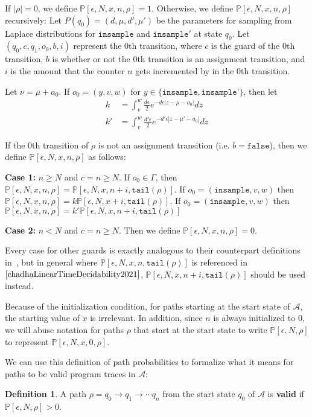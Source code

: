 \documentclass[12pt]{article}
\newcommand{\PP}{\mathbb{P}}
\theoremstyle{definition}
\newtheorem{defn}[thm]{Definition}
\begin{document}
If $|\rho| = 0$, we define $\PP[\epsilon, N, x, n, \rho] = 1$.
Otherwise, we define $\PP[\epsilon, N, x, n, \rho]$ recursively:
Let $P(q_0) = (d, \mu, d', \mu')$ be the parameters for sampling from Laplace distributions for $\texttt{insample}$ and $\texttt{insample}'$ at state $q_0$. Let $(q_0, c, q_1, o_0, b, i)$ represent the 0th transition, where $c$ is the guard of the 0th transition, $b$ is whether or not the 0th transition is an assignment transition, and $i$ is the amount that the counter $n$ gets incremented by in the 0th transition.

Let $\nu = \mu + a_0$. If $o_0 = (y, v, w)$ for $y\in \{\texttt{insample}, \texttt{insample'}\}$, then let \begin{align*}
	k &= \int_{v}^{w}\frac{d\epsilon}{2}e^{-d\epsilon|z-\mu-a_0|}dz\\
	k' &= \int_v^w\frac{d'\epsilon}{2}e^{-d'\epsilon|z-\mu'-a_0|}dz
\end{align*}


If the 0th transition of $\rho$ is not an assignment transition (i.e. $b = \texttt{false}$), then we define $\PP[\epsilon, N, x, n, \rho]$ as follows:

\textbf{Case 1:} $n\geq N$ and $c = n \geq N$.
If $o_0 \in \Gamma$, then $\PP[\epsilon, N, x, n, \rho] = \PP[\epsilon, N, x, n+i, \texttt{tail}(\rho)]$. If $o_0 = (\texttt{insample}, v, w)$ then $\PP[\epsilon, N, x, n, \rho] = k\PP[\epsilon, N, x+i, \texttt{tail}(\rho)]$. If $o_0 = (\texttt{insample}, v, w)$ then $\PP[\epsilon, N, x, n, \rho] = k'\PP[\epsilon, N, x, n+i, \texttt{tail}(\rho)]$

\textbf{Case 2:} $n < N$ and $c = n\geq N$. Then we define $\PP[\epsilon, N, x, n, \rho] = 0$.

Every case for other guards is exactly analogous to their counterpart definitions in~\cite{chadhaLinearTimeDecidability2021}, but in general where $\PP[\epsilon,N, x, n, \texttt{tail}(\rho)]$ is referenced in $\cite{chadhaLinearTimeDecidability2021}$, $\PP[\epsilon, N,x, n+i ,\texttt{tail}(\rho)]$ should be used instead.

Because of the initialization condition, for paths starting at the start state of $\mathcal{A}$, the starting value of $x$ is irrelevant. In addition, since $n$ is always initialized to 0, we will abuse notation for paths $\rho$ that start at the start state to write $\PP[\epsilon, N, \rho]$ to represent $\PP[\epsilon, N, x, 0, \rho]$.

We can use this definition of path probabilities to formalize what it means for paths to be valid program traces in $\mathcal{A}$:
\begin{defn}
	A path $\rho = q_0\to q_1\to\cdots q_n$ from the start state $q_0$ of $\mathcal{A}$ is \textbf{valid} if $\PP[\epsilon, N, \rho]> 0$.
\end{defn}
\end{document}

